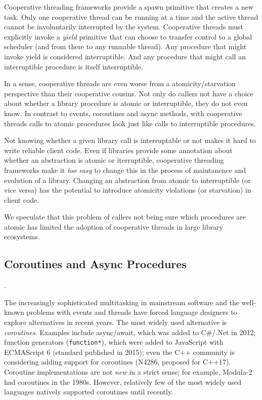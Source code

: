 \documentclass[9pt,preprint]{sigplanconf}
\begin{document}
Cooperative threading frameworks provide a spawn primitive that creates a new task.
Only one cooperative thread can be running at a time and the active thread cannot be involuntarily interrupted by the system.
Cooperative threads must explicitly invoke a \emph{yield} primitive that can choose to transfer control to a global scheduler (and from there to any runnable thread).
Any procedure that might invoke yield is considered interruptible.
And any procedure that might call an interruptible procedure is itself interruptible.

In a sense, cooperative threads are even worse from a atomicity/starvation perspective than their cooperative cousins.
Not only do callers not have a choice about whether a library procedure is atomic or interruptible, they do not even know.
In contrast to events, coroutines and async methods, with cooperative threads calls to atomic procedures look just like calls to interruptible procedures.

Not knowing whether a given library call is interruptable or not makes it hard to write reliable client code.
Even if libraries provide some annotation about whether an abstraction is atomic or iterruptible, cooperative threading frameworks make it \emph{too easy} to change this in the process of maintanence and evolution of a library.
Changing an abstraction from atomic to interruptible (or vice versa) has the potential to introduce atomicity violations (or starvation) in client code.

We speculate that this problem of callers not being sure which procedures are atomic has limited the adoption of cooperative threads in large library ecosystems.

\subsection{Coroutines and Async Procedures}.

The increasingly sophisticated multitasking in mainstream software and the well-known problems with events and threads have forced language designers to explore alternatives in recent years.
The most widely used alternative is \emph{coroutines}\footnotemark{}.
Examples include async/await, which was added to C\#/.Net in 2012; function generators (\texttt{function*}), which were added to JavaScript with ECMAScript 6 (standard published in 2015); even the C++ community is considering adding support for coroutines (N4286, proposed for C++17).
Coroutine implementations are not \emph{new} in a strict sense; for example, Modula-2 had coroutines in the 1980s.
However, relatively few of the most widely used languages natively supported coroutines until recently.
\end{document}

